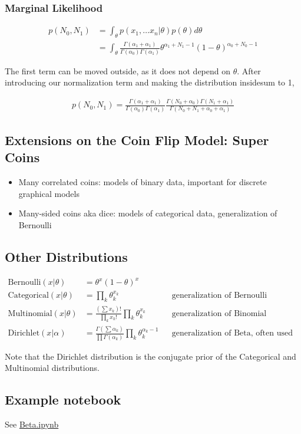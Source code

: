 \documentclass{article}
\begin{document}
\subsubsection*{Marginal Likelihood}
\begin{align*}
p(N_0, N_1) &= \int_\theta p(x_1, \hdots x_n | \theta) p(\theta) d\theta \\
&= \int_\theta \frac{\Gamma( \alpha_1 +  \alpha_1)}{\Gamma(\alpha_0)\Gamma(\alpha_1)} \theta^{\alpha_1 + N_1 -1} (1-\theta)^{\alpha_0+N_0-1}
\end{align*}

\noindent The first term can be moved outside, as it does not depend on $\theta$. After introducing our normalization term and making the distribution insidesum to 1,

\begin{align*}
p(N_0, N_1) = \frac{\Gamma( \alpha_1 +  \alpha_1)}{\Gamma(\alpha_0)\Gamma(\alpha_1)} \frac{\Gamma(N_0 + \alpha_0)\Gamma(N_1 + \alpha_1)}{\Gamma(N_0 + N_1 + \alpha_0 + \alpha_1)}
\end{align*}

\subsection{Extensions on the Coin Flip Model: Super Coins}
\begin{itemize}
\item Many correlated coins: models of binary data, important for discrete graphical models
\item Many-sided coins aka dice: models of categorical data, generalization of Bernoulli
\end{itemize}

\subsection{Other Distributions}
\begin{align*}
\textrm{Bernoulli}(x|\theta) &= \theta^{x}(1-\theta)^x \\
\textrm{Categorical}(x|\theta) &= \prod_k\theta_k^{x_k} && \text{generalization of Bernoulli} \\
\textrm{Multinomial}(x|\theta) &= \frac{(\sum x_k) !}{\prod_k x_k!}\prod_k\theta_k^{x_k} && \text{generalization of Binomial} \\
\textrm{Dirichlet}(x|\alpha) &= \frac{\Gamma(\sum \alpha_k)}{\prod \Gamma(\alpha_k)}\prod_k\theta_k^{\alpha_k-1} && \text{generalization of Beta, often used as a prior}
\end{align*}

\noindent Note that the Dirichlet distribution is the conjugate prior of the Categorical and Multinomial distributions.

\subsection{Example notebook}
See \href{https://github.com/harvard-ml-courses/cs281-demos/blob/master/Beta.ipynb}{Beta.ipynb}
\end{document}
